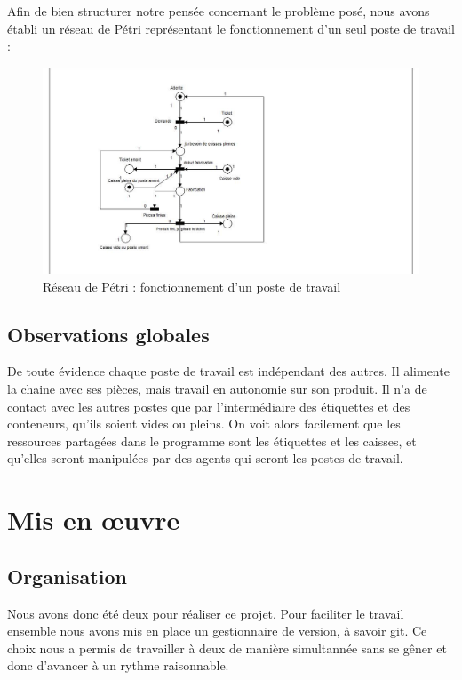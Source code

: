 \documentclass[11pt]{report}
\begin{document}
	Afin de bien structurer notre pensée concernant le problème posé, nous avons établi un réseau de Pétri représentant le fonctionnement d'un seul poste de travail :
	
	\begin{figure}[!h]
\centering
\includegraphics[width=16cm]{reseau.jpg}
\caption{Réseau de Pétri : fonctionnement d'un poste de travail}
\end{figure}
	
	\section{Observations globales}
		De toute évidence chaque poste de travail est indépendant des autres. Il alimente la chaine avec ses pièces, mais travail en autonomie sur son produit. Il n'a de contact avec les autres postes que par l'intermédiaire des étiquettes et des conteneurs, qu'ils soient vides ou pleins. On voit alors facilement que les ressources partagées dans le programme sont les étiquettes et les caisses, et qu'elles seront manipulées par des agents qui seront les postes de travail. 
	
		
\chapter{Mis en \oe{}uvre}

	\section{Organisation}
	Nous avons donc été deux pour réaliser ce projet. Pour faciliter le travail ensemble nous avons mis en place un gestionnaire de version, à savoir git. Ce choix nous a permis de travailler à deux de manière simultannée sans se gêner et donc d'avancer à un rythme raisonnable. 
	
\end{document}
